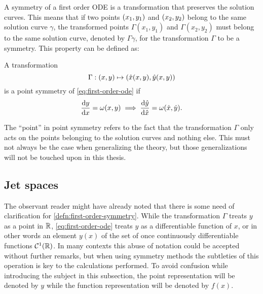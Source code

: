 A symmetry of a first order ODE  is a transformation that preserves the solution curves.
This means that if two points \(\pqty{x_1,y_1}\) and \(\pqty{x_2,y_2}\) belong to the same solution curve \(\gamma\), the transformed points \(\Gamma(x_1,y_1)\) and \(\Gamma(x_2,y_2)\) must belong to the same solution curve, denoted by \(\Gamma\gamma\), for the transformation \(\Gamma\) to be a symmetry.
This property can be defined as:
\begin{defn} \label{defn:first-order-symmetry}
  A transformation 
  \begin{equation}
    \Gamma: \pqty{x,y} \mapsto \pqty{\hat{x}(x,y), \hat{y}(x,y)}
  \end{equation}
  is a point symmetry of \cref{eq:first-order-ode} if
  \begin{equation}
    \diff{y}{x} = \omega(x,y)
    \implies
    \diff{\hat{y}}{\hat{x}} = \omega(\hat{x},\hat{y}).
  \end{equation}
\end{defn}
The \enquote{point} in point symmetry refers to the fact that the transformation \(\Gamma\) only acts on the points belonging to the solution curves and nothing else.
This must not always be the case when generalizing the theory, but those generalizations will not be touched upon in this thesis.

\subsection{Jet spaces} \label{subsec:jet-spaces}

The observant reader might have already noted that there is some need of clarification for \cref{defn:first-order-symmetry}.
While the transformation \(\Gamma\) treats \(y\) as a point in \(\mathbb{R}\), \cref{eq:first-order-ode} treats \(y\) as a differentiable function of \(x\), or in other words an element \(y(x)\) of the set of once continuously differentiable functions \(\mathcal{C}^1(\mathbb{R})\).
In many contexts this abuse of notation could be accepted without further remarks, but when using symmetry methods the subtleties of this operation is key to the calculations performed.
To avoid confusion while introducing the subject in this subsection, the point representation will be denoted by \(y\) while the function representation will be denoted by \(f(x)\).

